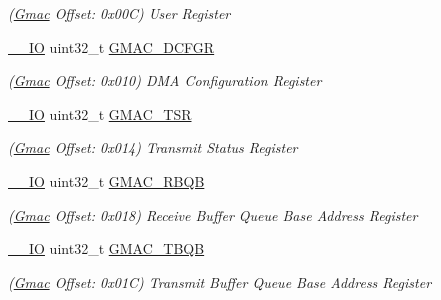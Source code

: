 \begin{DoxyCompactItemize}
\begin{DoxyCompactList}\small\item\em (\mbox{\hyperlink{structGmac}{Gmac}} Offset\+: 0x00C) User Register \end{DoxyCompactList}\item 
\mbox{\label{structGmac_a9d37ecbdce231a027dba4eefa1007f8f}} 
\mbox{\hyperlink{core__cm7_8h_aec43007d9998a0a0e01faede4133d6be}{\+\_\+\+\_\+\+IO}} uint32\+\_\+t \mbox{\hyperlink{structGmac_a9d37ecbdce231a027dba4eefa1007f8f}{G\+M\+A\+C\+\_\+\+D\+C\+F\+GR}}
\begin{DoxyCompactList}\small\item\em (\mbox{\hyperlink{structGmac}{Gmac}} Offset\+: 0x010) D\+MA Configuration Register \end{DoxyCompactList}\item 
\mbox{\label{structGmac_a8c6051fa1723a9f4a4e47d65fbe85351}} 
\mbox{\hyperlink{core__cm7_8h_aec43007d9998a0a0e01faede4133d6be}{\+\_\+\+\_\+\+IO}} uint32\+\_\+t \mbox{\hyperlink{structGmac_a8c6051fa1723a9f4a4e47d65fbe85351}{G\+M\+A\+C\+\_\+\+T\+SR}}
\begin{DoxyCompactList}\small\item\em (\mbox{\hyperlink{structGmac}{Gmac}} Offset\+: 0x014) Transmit Status Register \end{DoxyCompactList}\item 
\mbox{\label{structGmac_a988d344885ec91c6872518d0a58b7f37}} 
\mbox{\hyperlink{core__cm7_8h_aec43007d9998a0a0e01faede4133d6be}{\+\_\+\+\_\+\+IO}} uint32\+\_\+t \mbox{\hyperlink{structGmac_a988d344885ec91c6872518d0a58b7f37}{G\+M\+A\+C\+\_\+\+R\+B\+QB}}
\begin{DoxyCompactList}\small\item\em (\mbox{\hyperlink{structGmac}{Gmac}} Offset\+: 0x018) Receive Buffer Queue Base Address Register \end{DoxyCompactList}\item 
\mbox{\label{structGmac_ad65cbd60ed8de0d76d7f69bb86240b16}} 
\mbox{\hyperlink{core__cm7_8h_aec43007d9998a0a0e01faede4133d6be}{\+\_\+\+\_\+\+IO}} uint32\+\_\+t \mbox{\hyperlink{structGmac_ad65cbd60ed8de0d76d7f69bb86240b16}{G\+M\+A\+C\+\_\+\+T\+B\+QB}}
\begin{DoxyCompactList}\small\item\em (\mbox{\hyperlink{structGmac}{Gmac}} Offset\+: 0x01C) Transmit Buffer Queue Base Address Register \end{DoxyCompactList}\item 

\end{DoxyCompactItemize}
